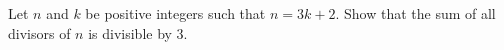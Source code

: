 Let $n$ and $k$ be positive integers such that $n=3k +2$.
Show that the sum of all divisors of $n$ is divisible by $3$.
